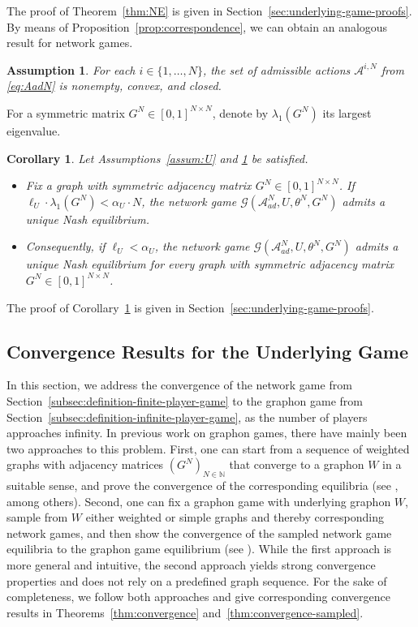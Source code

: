\documentclass[11pt]{article}
\newcommand{\N}{{\mathbb N}}
\newtheorem{corollary}[theorem]{Corollary}
\newtheorem{assumption}[theorem]{Assumption}
\numberwithin{equation}{section}
\begin{document}
The proof of Theorem~\ref{thm:NE} is given in Section~\ref{sec:underlying-game-proofs}. By means of Proposition~\ref{prop:correspondence}, we can obtain an analogous result for network games.

\begin{assumption}\label{assum:network}
For each $i\in \{1,\ldots, N\}$, the set of admissible actions $\mathcal{A}^{i,N}$ from \eqref{eq:AadN} is nonempty, convex, and closed.
\end{assumption}
For a symmetric matrix $G^N\in[0,1]^{N\times N}$, denote by $\lambda_{1}(G^N)$ its largest eigenvalue.

\begin{corollary}
\label{cor:NE-network}
Let Assumptions~\ref{assum:U} and \ref{assum:network} be satisfied.
\begin{itemize}
    \item[(i)]  Fix a graph with symmetric adjacency matrix $G^N\in[0,1]^{N\times N}$. If $\ell_U\cdot\lambda_{1}(G^N)<\alpha_U \cdot N$, the network game $\mathcal{G}(\mathcal A_{ad}^N,U,\theta^N,G^N)$ admits a unique Nash equilibrium.
    \item[(ii)]  Consequently, if $\ell_U<\alpha_U$, the network game $\mathcal{G}(\mathcal A_{ad}^N,U,\theta^N,G^N)$ admits a unique Nash equilibrium for every graph with symmetric adjacency matrix $G^N\in[0,1]^{N\times N}$.
\end{itemize}
\end{corollary}
The proof of Corollary~\ref{cor:NE-network} is given in Section~\ref{sec:underlying-game-proofs}.

\subsection{Convergence Results for the Underlying Game}\label{subsec:convergence}

In this section, we address the convergence of the network game from Section~\ref{subsec:definition-finite-player-game} to the graphon game from Section~\ref{subsec:definition-infinite-player-game}, as the number of players approaches infinity. In previous work on graphon games, there have mainly been two approaches to this problem. First, one can start from a sequence of weighted graphs with adjacency matrices $(G^N)_{N\in\N}$ that converge to a graphon $W$ in a suitable sense, and prove the convergence of the corresponding equilibria (see \cite{bayraktar2023propagation,carmona2022stochastic,gao2020linear,lacker2023label,neuman2024stochastic,tangpi2024optimal}, among others). Second, one can fix a graphon game with underlying graphon $W$, sample from $W$ either weighted or simple graphs and thereby corresponding network games, and then show the convergence of the sampled network game equilibria to the graphon game equilibrium (see \cite{aurell2022stochastic,carmona2022stochastic,neuman2024stochastic,parise2023graphon}). While the first approach is more general and intuitive, the second approach yields strong convergence properties and does not rely on a predefined graph sequence. For the sake of completeness, we follow both approaches and give corresponding convergence results in Theorems~\ref{thm:convergence} and~\ref{thm:convergence-sampled}.
\end{document}
